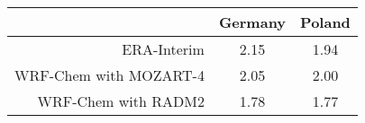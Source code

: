 {\renewcommand{\arraystretch}{1.2}
\begin{tabular}{r|c|c}
	\hline\hline
    & \textbf{Germany} & \textbf{Poland} \\
	\hline\hline
	 ERA-Interim & 2.15 & 1.94 \\
	 WRF-Chem with MOZART-4 & 2.05 & 2.00 \\
	 WRF-Chem with RADM2 & 1.78 & 1.77 \\
	\hline\hline
\end{tabular}}
